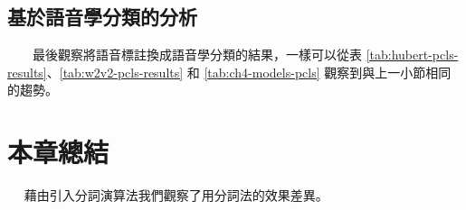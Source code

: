 \subsection{基於語音學分類的分析}
　　最後觀察將語音標註換成語音學分類的結果，一樣可以從表 \ref{tab:hubert-pcls-results}、\ref{tab:w2v2-pcls-results} 和 \ref{tab:ch4-models-pcls} 觀察到與上一小節相同的趨勢。   

\section{本章總結} {　  藉由引入分詞演算法我們觀察了用分詞法的效果差異。
}
